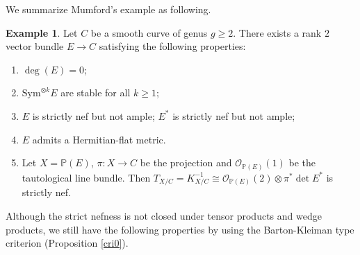 \documentclass[english,reqno]{amsart}
\newcommand\bbP{{\mathbb P}}
\newcommand\sO{{\mathscr O}}
\theoremstyle{plain}
\theoremstyle{definition}
\newtheorem{example}[thm]{Example}
\numberwithin{equation}{section} %
\begin{document}
\noindent We summarize Mumford's example as following.
\begin{example}\label{Mumfordexample} Let $C$ be a smooth curve of genus $g\geq 2$. There exists a rank $2$ vector bundle $E\rightarrow C$ satisfying the following properties:
    \begin{enumerate}
        \item $\deg(E)=0$;
        \item $\mathrm{Sym}^{\otimes k} E$ are stable for all $k\geq 1$;
        \item $E$ is strictly nef but not ample; $E^*$ is strictly nef but not ample;
        \item $E$ admits a Hermitian-flat metric.
\item
Let $X=\bbP(E)$, $\pi:X\rightarrow C$ be the projection and $\sO_{\bbP(E)}(1)$ be the tautological line bundle. Then $T_{X/C}=K^{-1}_{X/C}\cong \sO_{\bbP(E)}(2)\otimes \pi^*\det E^*$ is strictly nef.
    \end{enumerate}
\end{example}














 Although the strict nefness is not closed under tensor products and wedge products,  we still have the following   properties by using the Barton-Kleiman type criterion (Proposition \ref{cri0}).
\end{document}
